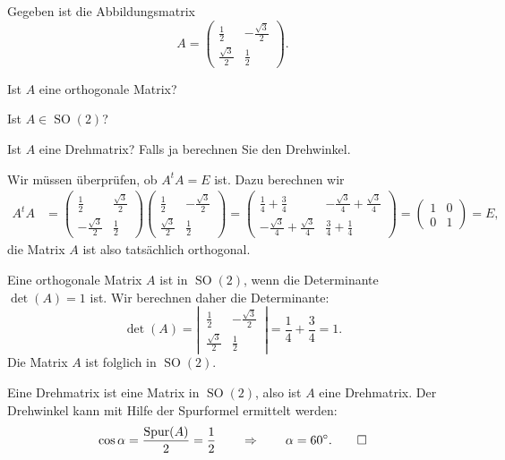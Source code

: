 Gegeben ist die Abbildungsmatrix
\[
A=\begin{pmatrix}
\frac12         &-\frac{\sqrt{3}}2\\
\frac{\sqrt{3}}2&\frac12
\end{pmatrix}.
\]
\begin{teilaufgaben}
\item
Ist $A$ eine orthogonale Matrix?
\item
Ist $A\in \operatorname{SO}(2)$?
\item
Ist $A$ eine Drehmatrix? Falls ja berechnen Sie den Drehwinkel.
\end{teilaufgaben}


\begin{loesung}
\begin{teilaufgaben}
\item Wir müssen überprüfen, ob $A^tA=E$ ist.
Dazu berechnen wir
\begin{align*}
A^tA
&=
\begin{pmatrix}
\frac12         &\frac{\sqrt{3}}2\\
-\frac{\sqrt{3}}2&\frac12
\end{pmatrix}
\begin{pmatrix}
\frac12         &-\frac{\sqrt{3}}2\\
\frac{\sqrt{3}}2&\frac12
\end{pmatrix}
=
\begin{pmatrix}
\frac14+\frac34&-\frac{\sqrt{3}}{4}+\frac{\sqrt{3}}{4}\\
-\frac{\sqrt{3}}{4}+\frac{\sqrt{3}}{4}&\frac34+\frac14
\end{pmatrix}
=
\begin{pmatrix}
1&0\\
0&1
\end{pmatrix}
=E,
\end{align*}
die Matrix $A$ ist also tatsächlich orthogonal.
\item
Eine orthogonale Matrix $A$ ist in $\operatorname{SO}(2)$, wenn die
Determinante $\det(A)=1$ ist.
Wir berechnen daher die Determinante:
\[
\det(A)
=
\left|\,\begin{matrix}
\frac12         &-\frac{\sqrt{3}}2\\
\frac{\sqrt{3}}2&\frac12
\end{matrix}\,\right|
=
\frac14+\frac34
=
1.
\]
Die Matrix $A$ ist folglich in $\operatorname{SO}(2)$.
\item
Eine Drehmatrix ist eine Matrix in $\operatorname{SO}(2)$, also ist
$A$ eine Drehmatrix. 
Der Drehwinkel kann mit Hilfe der Spurformel ermittelt werden:
\[
\cos \alpha
=
\frac{\operatorname{Spur}(A)}2
=
\frac12
\qquad\Rightarrow\qquad
\alpha = 60^\circ.
\qedhere
\]
\end{teilaufgaben}
\end{loesung}



